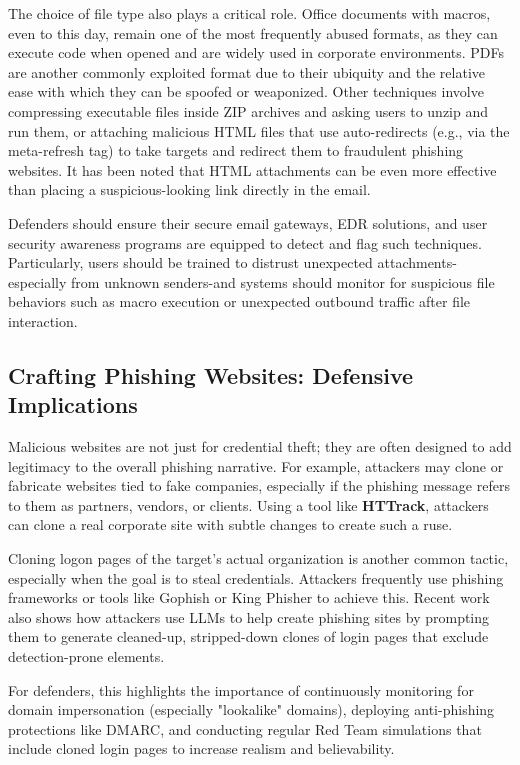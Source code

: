 The choice of file type also plays a critical role. Office documents with macros, even to this day, remain one of the most frequently abused formats, as they can execute code when opened and are widely used in corporate environments. PDFs are another commonly exploited format due to their ubiquity and the relative ease with which they can be spoofed or weaponized. Other techniques involve compressing executable files inside ZIP archives and asking users to unzip and run them, or attaching malicious HTML files that use auto-redirects (e.g.,  via the meta-refresh tag) to take targets and redirect them to fraudulent phishing websites. It has been noted that HTML attachments can be even more effective than placing a suspicious-looking link directly in the email.

Defenders should ensure their secure email gateways, EDR solutions, and user security awareness programs are equipped to detect and flag such techniques. Particularly, users should be trained to distrust unexpected attachments-especially from unknown senders-and systems should monitor for suspicious file behaviors such as macro execution or unexpected outbound traffic after file interaction.

\subsection{Crafting Phishing Websites: Defensive Implications}
Malicious websites are not just for credential theft; they are often designed to add legitimacy to the overall phishing narrative. For example, attackers may clone or fabricate websites tied to fake companies, especially if the phishing message refers to them as partners, vendors, or clients. Using a tool like \textbf{HTTrack}, attackers can clone a real corporate site with subtle changes to create such a ruse.

Cloning logon pages of the target's actual organization is another common tactic, especially when the goal is to steal credentials. Attackers frequently use phishing frameworks or tools like Gophish or King Phisher to achieve this. Recent work also shows how attackers use LLMs to help create phishing sites by prompting them to generate cleaned-up, stripped-down clones of login pages that exclude detection-prone elements.

For defenders, this highlights the importance of continuously monitoring for domain impersonation (especially "lookalike" domains), deploying anti-phishing protections like DMARC, and conducting regular Red Team simulations that include cloned login pages to increase realism and believability.

